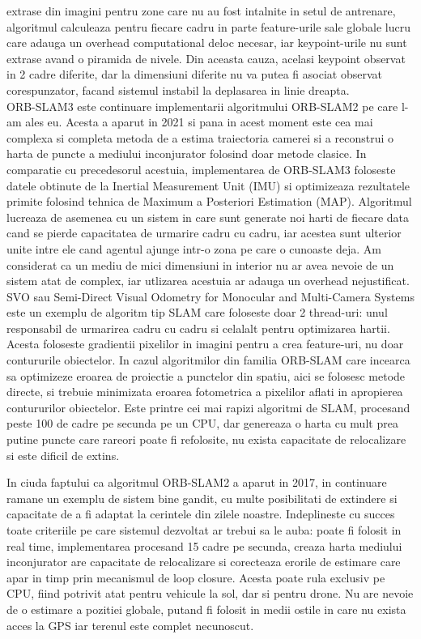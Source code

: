 \documentclass[12pt,a4paper]{report}
\begin{document}
extrase din imagini pentru zone care nu au fost intalnite in setul de antrenare, algoritmul
calculeaza pentru fiecare cadru in parte feature-urile sale globale lucru care adauga un 
overhead computational deloc necesar, iar keypoint-urile nu sunt extrase avand o piramida de 
nivele. Din aceasta cauza, acelasi keypoint observat in 2 cadre diferite, dar la dimensiuni 
diferite nu va putea fi asociat observat corespunzator, facand sistemul instabil la deplasarea 
in linie dreapta.  \\
ORB-SLAM3 este continuare implementarii algoritmului ORB-SLAM2 pe care l-am ales eu.
Acesta a aparut in 2021 si pana in acest moment este cea mai complexa si completa metoda de a
estima traiectoria camerei si a reconstrui o harta de puncte a mediului inconjurator folosind 
doar metode clasice. In comparatie cu precedesorul acestuia, implementarea de ORB-SLAM3 foloseste
datele obtinute de la Inertial Measurement Unit (IMU) si optimizeaza rezultatele primite 
folosind tehnica de Maximum a Posteriori Estimation (MAP). Algoritmul lucreaza de asemenea cu un 
sistem in care sunt generate noi harti de fiecare data cand se pierde capacitatea de urmarire 
cadru cu cadru, iar acestea sunt ulterior unite intre ele cand agentul ajunge intr-o zona pe 
care o cunoaste deja. Am considerat ca un mediu de mici dimensiuni in interior nu ar avea 
nevoie de un sistem atat de complex, iar utlizarea acestuia ar adauga un overhead nejustificat.\\
SVO sau Semi-Direct Visual Odometry for Monocular and Multi-Camera Systems este un exemplu 
de algoritm tip SLAM care foloseste doar 2 thread-uri: unul responsabil de 
urmarirea cadru cu cadru si celalalt pentru optimizarea hartii. Acesta foloseste gradientii
pixelilor in imagini pentru a crea feature-uri, nu doar contururile obiectelor. In cazul
algoritmilor din familia ORB-SLAM care incearca sa optimizeze eroarea de proiectie a punctelor
din spatiu, aici se folosesc metode directe, si trebuie minimizata eroarea fotometrica a 
pixelilor aflati in apropierea contururilor obiectelor. Este printre cei mai rapizi algoritmi
de SLAM, procesand peste 100 de cadre pe secunda pe un CPU, dar genereaza o harta cu mult 
prea putine puncte care rareori poate fi refolosite, nu exista capacitate de relocalizare si 
este dificil de extins.

In ciuda faptului ca algoritmul ORB-SLAM2 a aparut in 2017, in continuare ramane
un exemplu de sistem bine gandit, cu multe posibilitati de extindere si capacitate de a fi 
adaptat la cerintele din zilele noastre. Indeplineste cu succes toate criteriile pe care sistemul
dezvoltat ar trebui sa le auba: poate fi folosit in real time, implementarea procesand 15 cadre
pe secunda, creaza harta mediului inconjurator are capacitate de relocalizare si corecteaza 
erorile de estimare care apar in timp prin mecanismul de loop closure. Acesta poate rula exclusiv
pe CPU, fiind potrivit atat pentru vehicule la sol, dar si pentru drone. Nu are nevoie de o 
estimare a pozitiei globale, putand fi folosit in medii ostile in care nu exista acces la GPS 
iar terenul este complet necunoscut.  
\end{document}
